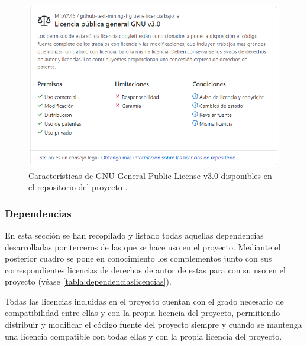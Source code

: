 \begin{figure}[!ht]
	\centering
\includegraphics[width=\textwidth]{img/licencia_GNUGPLv3.png}
	\caption{Características de GNU General Public License v3.0 disponibles en el repositorio del proyecto \cite{vl:project-license-2021}.}
	\label{fig:gnu-gplv3}
\end{figure}

\subsubsection{Dependencias}

En esta sección se han recopilado y listado todas aquellas dependencias desarrolladas por terceros de las que se hace uso en el proyecto. Mediante el posterior cuadro se pone en conocimiento los complementos junto con sus correspondientes licencias de derechos de autor de estas para con su uso en el proyecto (véase \autoref{tabla:dependenciaslicencias}).

Todas las licencias incluidas en el proyecto cuentan con el grado necesario de compatibilidad entre ellas y con la propia licencia del proyecto, permitiendo distribuir y modificar el código fuente del proyecto siempre y cuando se mantenga una licencia compatible con todas ellas y con la propia licencia del proyecto.

